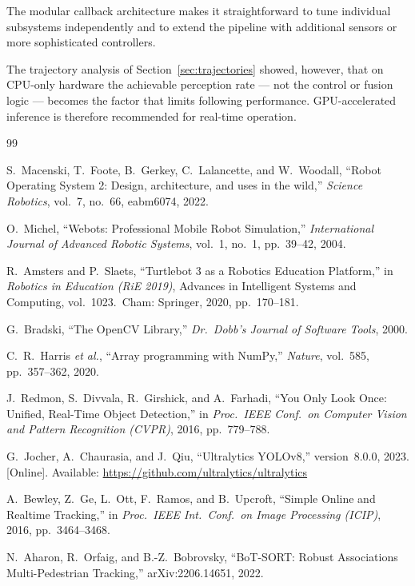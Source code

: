\documentclass[12pt,a4paper]{article}
\begin{document}
The modular callback architecture makes it straightforward to tune individual
subsystems independently and to extend the pipeline with additional sensors or
more sophisticated controllers.

The trajectory analysis of Section~\ref{sec:trajectories} showed, however,
that on CPU-only hardware the achievable perception rate --- not the control
or fusion logic --- becomes the factor that limits following performance.
GPU-accelerated inference is therefore recommended for real-time operation.

\newpage
{}
\begin{thebibliography}{99}

S.~Macenski, T.~Foote, B.~Gerkey, C.~Lalancette, and W.~Woodall,
``Robot Operating System 2: Design, architecture, and uses in the wild,''
\emph{Science Robotics}, vol.~7, no.~66, eabm6074, 2022.

O.~Michel,
``Webots: Professional Mobile Robot Simulation,''
\emph{International Journal of Advanced Robotic Systems}, vol.~1, no.~1,
pp.~39--42, 2004.

R.~Amsters and P.~Slaets,
``Turtlebot 3 as a Robotics Education Platform,''
in \emph{Robotics in Education (RiE 2019)}, Advances in Intelligent Systems
and Computing, vol.~1023.\ Cham: Springer, 2020, pp.~170--181.

G.~Bradski,
``The OpenCV Library,''
\emph{Dr.\ Dobb's Journal of Software Tools}, 2000.

C.~R.~Harris \emph{et al.},
``Array programming with NumPy,''
\emph{Nature}, vol.~585, pp.~357--362, 2020.

J.~Redmon, S.~Divvala, R.~Girshick, and A.~Farhadi,
``You Only Look Once: Unified, Real-Time Object Detection,''
in \emph{Proc.\ IEEE Conf.\ on Computer Vision and Pattern Recognition
(CVPR)}, 2016, pp.~779--788.

G.~Jocher, A.~Chaurasia, and J.~Qiu,
``Ultralytics YOLOv8,'' version~8.0.0, 2023. [Online]. Available:
\url{https://github.com/ultralytics/ultralytics}

A.~Bewley, Z.~Ge, L.~Ott, F.~Ramos, and B.~Upcroft,
``Simple Online and Realtime Tracking,''
in \emph{Proc.\ IEEE Int.\ Conf.\ on Image Processing (ICIP)}, 2016,
pp.~3464--3468.

N.~Aharon, R.~Orfaig, and B.-Z.~Bobrovsky,
``BoT-SORT: Robust Associations Multi-Pedestrian Tracking,''
arXiv:2206.14651, 2022.


\end{thebibliography}
\end{document}
